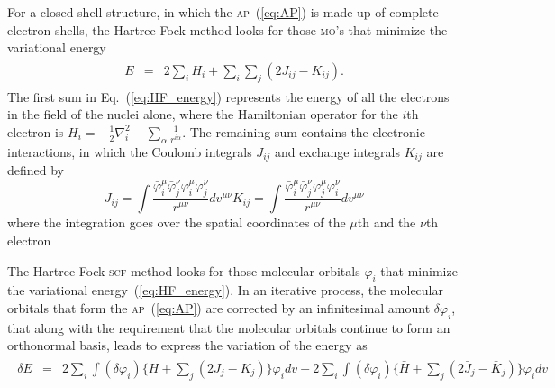 For a closed-shell structure, in which the \textsc{ap}~(\ref{eq:AP})
is made up of complete electron shells, the Hartree-Fock method looks
for those \textsc{mo}'s that minimize the variational
energy~\cite{Roothaan_HF}
%
\begin{eqnarray}
  \begin{split}
    E & = & 2\sum\limits_{i} H_{i} + \sum\limits_{i}\sum\limits_{j} (2J_{ij} -
    K_{ij}).
  \end{split}
  \label{eq:HF_energy}
\end{eqnarray}
%
The first sum in Eq.~(\ref{eq:HF_energy}) represents the energy of all
the electrons in the field of the nuclei alone, where the Hamiltonian
operator for the $i$th electron is $H_{i} = -\frac{1}{2}
\nabla_{i}^{2} - \sum\limits_{\alpha} \frac{1}{r^{i\alpha}}$. The
remaining sum contains the electronic interactions, in which the
Coulomb integrals $J_{ij}$ and exchange integrals $K_{ij}$ are defined
by
%
\begin{subequations}
  \begin{equation} \label{eq:Coulomb}
    J_{ij} = \int \frac{\bar\varphi_{i}^{\mu} \bar\varphi_{j}^{\nu}
      \varphi_{i}^{\mu} \varphi_{j}^{\nu}}{r^{\mu\nu}} dv^{\mu\nu}
  \end{equation}
  \begin{equation} \label{eq:exchange}
    K_{ij} = \int \frac{\bar\varphi_{i}^{\mu} \bar\varphi_{j}^{\nu}
      \varphi_{j}^{\mu} \varphi_{i}^{\nu}}{r^{\mu\nu}} dv^{\mu\nu}
  \end{equation}
\end{subequations}
%
where the integration goes over the spatial coordinates of the
$\mu$th and the $\nu$th electron

The Hartree-Fock \textsc{scf} method looks for those molecular
orbitals $\varphi_{i}$ that minimize the variational
energy~(\ref{eq:HF_energy}). In an iterative process, the molecular
orbitals that form the \textsc{ap}~(\ref{eq:AP}) are corrected by an
infinitesimal amount $\delta\varphi_{i}$, that along with the
requirement that the molecular orbitals continue to form an
orthonormal basis, leads to express the variation of the energy
as~\cite{Roothaan_HF}
%
\begin{eqnarray}
  \begin{split}
    \delta E & = & 2 \sum\limits_{i} \int (\delta\bar\varphi_{i})
    \{ H + \sum\limits_{j} (2J_{j} - K_{j}) \} \varphi_{i} dv +
    2 \sum\limits_{i} \int (\delta\varphi_{i})
    \{ \bar H + \sum\limits_{j} (2\bar J_{j} - \bar K_{j}) \}
    \bar\varphi_{i} dv
  \end{split}
  \label{eq:delta_Ehf}
\end{eqnarray}
%

